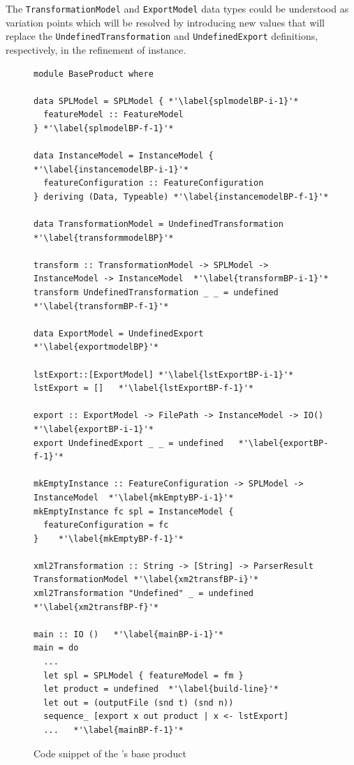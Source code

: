
The \texttt{TransformationModel} and \texttt{ExportModel} data types could be understood as variation points which will be resolved by introducing new values ​​that will replace the \texttt{UndefinedTransformation} and \texttt{UndefinedExport} definitions, respectively, in the refinement of \hpl{} instance.


\begin{figure}
\begin{lstlisting}
module BaseProduct where

data SPLModel = SPLModel { *'\label{splmodelBP-i-1}'*
  featureModel :: FeatureModel
} *'\label{splmodelBP-f-1}'*

data InstanceModel = InstanceModel { *'\label{instancemodelBP-i-1}'*
  featureConfiguration :: FeatureConfiguration
} deriving (Data, Typeable) *'\label{instancemodelBP-f-1}'*

data TransformationModel = UndefinedTransformation *'\label{transformmodelBP}'*

transform :: TransformationModel -> SPLModel -> InstanceModel -> InstanceModel  *'\label{transformBP-i-1}'*
transform UndefinedTransformation _ _ = undefined  *'\label{transformBP-f-1}'*

data ExportModel = UndefinedExport *'\label{exportmodelBP}'*

lstExport::[ExportModel] *'\label{lstExportBP-i-1}'*
lstExport = []   *'\label{lstExportBP-f-1}'*

export :: ExportModel -> FilePath -> InstanceModel -> IO()  *'\label{exportBP-i-1}'*
export UndefinedExport _ _ = undefined   *'\label{exportBP-f-1}'*

mkEmptyInstance :: FeatureConfiguration -> SPLModel -> InstanceModel  *'\label{mkEmptyBP-i-1}'*
mkEmptyInstance fc spl = InstanceModel {
  featureConfiguration = fc
}    *'\label{mkEmptyBP-f-1}'*

xml2Transformation :: String -> [String] -> ParserResult TransformationModel *'\label{xm2transfBP-i}'*
xml2Transformation "Undefined" _ = undefined *'\label{xm2transfBP-f}'*

main :: IO ()   *'\label{mainBP-i-1}'*
main = do
  ...
  let spl = SPLModel { featureModel = fm }
  let product = undefined  *'\label{build-line}'*
  let out = (outputFile (snd t) (snd n))
  sequence_ [export x out product | x <- lstExport]
  ...   *'\label{mainBP-f-1}'*
\end{lstlisting}
\caption{Code snippet of the \hpl's base product}
\label{fig:code-hpl-base-product}
\end{figure}


